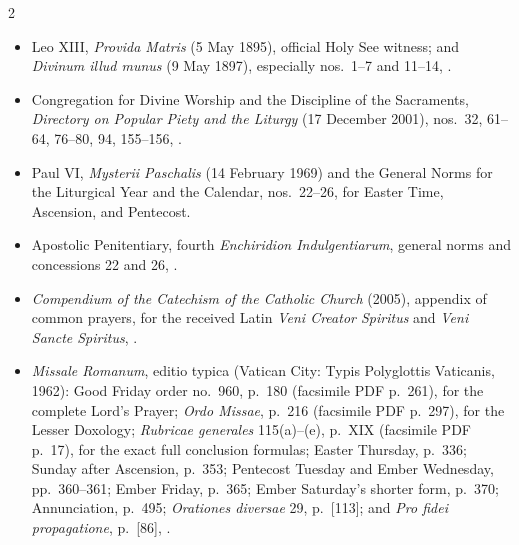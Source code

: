 \begin{multicols}{2}
\begin{itemize}
\item Leo XIII, \textit{Provida Matris} (5 May 1895), official Holy See witness; and \textit{Divinum illud munus} (9 May 1897), especially nos.~1--7 and 11--14, .
\item Congregation for Divine Worship and the Discipline of the Sacraments, \textit{Directory on Popular Piety and the Liturgy} (17 December 2001), nos.~32, 61--64, 76--80, 94, 155--156, .
\item Paul VI, \textit{Mysterii Paschalis} (14 February 1969) and the General Norms for the Liturgical Year and the Calendar, nos.~22--26, for Easter Time, Ascension, and Pentecost.
\item Apostolic Penitentiary, fourth \textit{Enchiridion Indulgentiarum}, general norms and concessions 22 and 26, .
\item \textit{Compendium of the Catechism of the Catholic Church} (2005), appendix of common prayers, for the received Latin \textit{Veni Creator Spiritus} and \textit{Veni Sancte Spiritus}, .
\item \textit{Missale Romanum}, editio typica (Vatican City: Typis Polyglottis Vaticanis, 1962): Good Friday order no.~960, p.~180 (facsimile PDF p.~261), for the complete Lord's Prayer; \textit{Ordo Missae}, p.~216 (facsimile PDF p.~297), for the Lesser Doxology; \textit{Rubricae generales} 115(a)--(e), p.~XIX (facsimile PDF p.~17), for the exact full conclusion formulas; Easter Thursday, p.~336; Sunday after Ascension, p.~353; Pentecost Tuesday and Ember Wednesday, pp.~360--361; Ember Friday, p.~365; Ember Saturday's shorter form, p.~370; Annunciation, p.~495; \textit{Orationes diversae} 29, p.~[113]; and \textit{Pro fidei propagatione}, p.~[86], .

\end{itemize}
\end{multicols}
